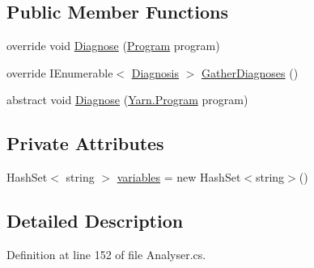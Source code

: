 \subsection*{Public Member Functions}
\begin{DoxyCompactItemize}
\item 
override void \hyperlink{a00166_a980f0e64bc5ad171c35ec19bdf838b5c}{Diagnose} (\hyperlink{a00138}{Program} program)
\item 
override I\-Enumerable$<$ \hyperlink{a00087}{Diagnosis} $>$ \hyperlink{a00166_ab84e7a8e68740379dee12a51dca69b07}{Gather\-Diagnoses} ()
\item 
abstract void \hyperlink{a00050_aba4a36cb823b11ee491074e26477d084}{Diagnose} (\hyperlink{a00138}{Yarn.\-Program} program)
\end{DoxyCompactItemize}
\subsection*{Private Attributes}
\begin{DoxyCompactItemize}
\item 
Hash\-Set$<$ string $>$ \hyperlink{a00166_a64ed6c3394c474b6cf5804a35f560746}{variables} = new Hash\-Set$<$string$>$()
\end{DoxyCompactItemize}


\subsection{Detailed Description}


Definition at line 152 of file Analyser.\-cs.



